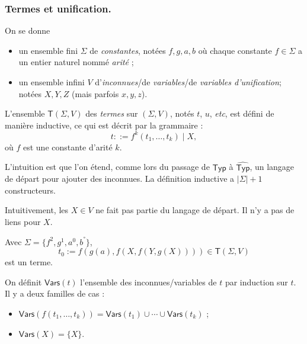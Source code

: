 \documentclass[../main]{subfiles}
\begin{document}
  \subsubsection{Termes et unification.}

  \begin{defn}
    On se donne
    \begin{itemize}
      \item un ensemble fini $\Sigma$ de  \textit{constantes}, notées $f, g, a, b$ où chaque constante  $f \in \Sigma$ a un entier naturel nommé \textit{arité} ;
      \item un ensemble infini $V$ d'\textit{inconnues}/de \textit{variables}/de \textit{variables d'unification}; notées $X, Y, Z$ (mais parfois $x, y,z$).
    \end{itemize}

    L'ensemble $\mathsf{T}(\Sigma, V)$ des \textit{termes} sur $(\Sigma, V)$, notés  $t$, $u$, \textit{etc}, est défini de manière inductive, ce qui est décrit par la grammaire : \[
    t ::= f^k (t_1, \ldots, t_k) \mid X
    ,\] 
    où $f$ est une constante d'arité $k$.
  \end{defn}

  \begin{rmk}
    L'intuition est que l'on étend, comme lors du passage de $\mathsf{Typ}$ à $\widehat{\mathsf{Typ}}$, un langage de départ pour ajouter des inconnues.
    La définition inductive a $|\Sigma| + 1$ constructeurs.

    Intuitivement, les  $X \in V$ ne fait pas partie du langage de départ.
    Il n'y a pas de liens pour $X$.
  \end{rmk}

  \begin{exm}
    Avec $\Sigma = \{f^2, g^1, a^0, b^°\}$, \[
      t_0 := f(g(a), f(X, f(Y, g(X)))) \in \mathsf{T}(\Sigma, V)
    \]
    est un terme.
  \end{exm}

  \begin{defn}
    On définit $\mathsf{Vars}(t)$ l'ensemble des inconnues/variables de $t$ par induction sur $t$.
    Il y a deux familles de cas :
    \begin{itemize}
      \item $\mathsf{Vars}(f(t_1, \ldots, t_k)) = \mathsf{Vars}(t_1) \cup \cdots \cup \mathsf{Vars}(t_k)$ ;
      \item $\mathsf{Vars}(X) = \{X\}$.
    \end{itemize}
  \end{defn}
\end{document}
